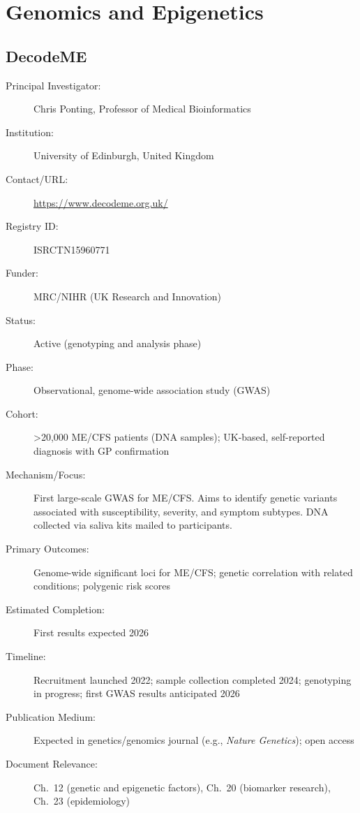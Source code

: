 \section{Genomics and Epigenetics}
\label{sec:registry-genomics}

\subsection{DecodeME}
\label{sec:registry-decodeme}

\begin{description}
    \item[Principal Investigator:] Chris Ponting, Professor of Medical
        Bioinformatics
    \item[Institution:] University of Edinburgh, United Kingdom
    \item[Contact/URL:] \url{https://www.decodeme.org.uk/}
    \item[Registry ID:] ISRCTN15960771
    \item[Funder:] MRC/NIHR (UK Research and Innovation)
    \item[Status:] Active (genotyping and analysis phase)
    \item[Phase:] Observational, genome-wide association study (GWAS)
    \item[Cohort:] \textgreater20,000 ME/CFS patients (DNA samples);
        UK-based, self-reported diagnosis with GP confirmation
    \item[Mechanism/Focus:] First large-scale GWAS for ME/CFS.  Aims to
        identify genetic variants associated with susceptibility, severity,
        and symptom subtypes.  DNA collected via saliva kits mailed to
        participants.
    \item[Primary Outcomes:] Genome-wide significant loci for ME/CFS;
        genetic correlation with related conditions; polygenic risk scores
    \item[Estimated Completion:] First results expected 2026
    \item[Timeline:] Recruitment launched 2022; sample collection completed
        2024; genotyping in progress; first GWAS results anticipated 2026
    \item[Publication Medium:] Expected in genetics/genomics journal
        (e.g., \textit{Nature Genetics}); open access
    \item[Document Relevance:] Ch.~12 (genetic and epigenetic factors),
        Ch.~20 (biomarker research), Ch.~23 (epidemiology)
\end{description}

